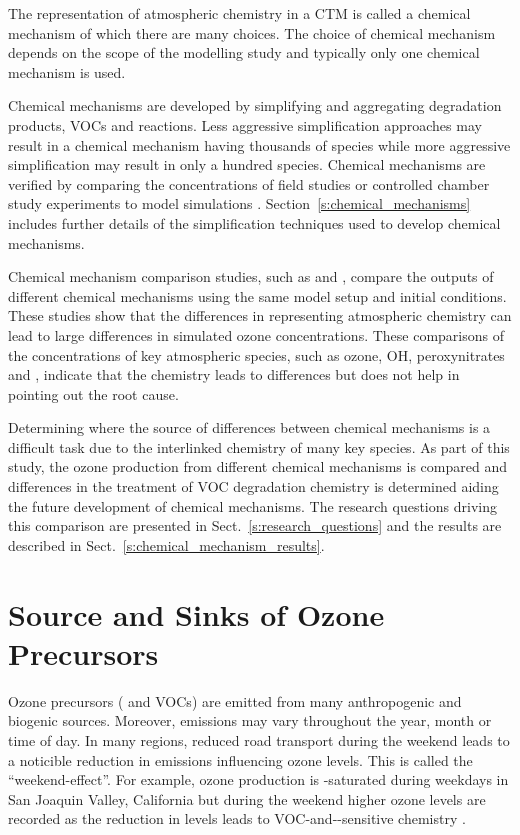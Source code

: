 The representation of atmospheric chemistry in a CTM is called a chemical mechanism of which there are many choices.
The choice of chemical mechanism depends on the scope of the modelling study and typically only one chemical mechanism is used.

Chemical mechanisms are developed by simplifying and aggregating degradation products, VOCs and reactions.
Less aggressive simplification approaches may result in a chemical mechanism having thousands of species while more aggressive simplification may result in only a hundred species. 
Chemical mechanisms are verified by comparing the concentrations of field studies or controlled chamber study experiments to model simulations \citep{Stockwell:2012}.
Section~\ref{s:chemical_mechanisms} includes further details of the simplification techniques used to develop chemical mechanisms.

Chemical mechanism comparison studies, such as \citet{Kuhn:1998} and \citet{Emmerson:2009}, compare the outputs of different chemical mechanisms using the same model setup and initial conditions.
These studies show that the differences in representing atmospheric chemistry can lead to large differences in simulated ozone concentrations.
These comparisons of the concentrations of key atmospheric species, such as ozone, OH, peroxynitrates and , indicate that the chemistry leads to differences but does not help in pointing out the root cause.

Determining where the source of differences between chemical mechanisms is a difficult task due to the interlinked chemistry of many key species.
As part of this study, the ozone production from different chemical mechanisms is compared and differences in the treatment of VOC degradation chemistry is determined aiding the future development of chemical mechanisms.
The research questions driving this comparison are presented in Sect.~\ref{s:research_questions} and the results are described in Sect.~\ref{s:chemical_mechanism_results}.

\section{Source and Sinks of Ozone Precursors} \label{s:precursor_emissions}
Ozone precursors ( and VOCs) are emitted from many anthropogenic and biogenic sources.
Moreover, emissions may vary throughout the year, month or time of day.
In many regions, reduced road transport during the weekend leads to a noticible reduction in  emissions influencing ozone levels.
This is called the ``weekend-effect''.
For example, ozone production is -saturated during weekdays in San Joaquin Valley, California but during the weekend higher ozone levels are recorded as the reduction in  levels leads to VOC-and--sensitive chemistry \citep{Pusede:2014}.

